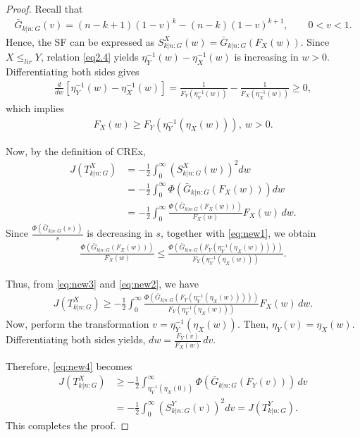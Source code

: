 \documentclass[12pt,a4paper]{article}
\numberwithin{equation}{section}
\begin{document}
\begin{proof}
Recall that
\begin{align*}
    \bar G_{k|n:G}(v)
    =
    (n-k+1)(1-v)^k-(n-k)(1-v)^{k+1},
    \qquad 0<v<1.
\end{align*}
Hence, the SF  can be expressed as
$S^X_{k|n:G}(w)
    =
    \bar G_{k|n:G}(F_X(w)).$ Since $X\leq_{lir}Y$, relation \eqref{eq2.4} yields $\eta_Y^{-1}(w)-\eta_X^{-1}(w)$
is increasing in $w>0$. Differentiating both sides gives
\begin{align*}
    \frac{d}{dw}
    \left[
    \eta_Y^{-1}(w)-\eta_X^{-1}(w)
    \right]
    =
    \frac{1}{F_Y(\eta_Y^{-1}(w))}
    -
    \frac{1}{F_X(\eta_X^{-1}(w))}
    \geq 0,
\end{align*}
which implies
\begin{align}\label{eq:new1}
    F_X(w)
    \geq
    F_Y\!\left(
    \eta_Y^{-1}(\eta_X(w))
    \right),~ w>0.
\end{align}

Now, by the definition of CREx,
\begin{align}
    J(T^X_{k|n:G})
    &=
    -\frac12
    \int_0^\infty
    \left(
    S^X_{k|n:G}(w)
    \right)^2
    dw
    \nonumber\\
    &=-\frac12
    \int_0^\infty
    \Phi\!\left(
    \bar G_{k|n:G}(F_X(w))
    \right)
    dw
    \nonumber\\
    &=-\frac12
    \int_0^\infty
    \frac{
    \Phi\!\left(
    \bar G_{k|n:G}(F_X(w))
    \right)
    }{F_X(w)}
    F_X(w)\,dw.
    \label{eq:new2}
\end{align}
Since $\frac{\Phi(\bar G_{k|n:G}(s))}{s}$
is decreasing in $s$, together with \eqref{eq:new1}, we obtain
\begin{align}
    \frac{
    \Phi(\bar G_{k|n:G}(F_X(w)))
    }{F_X(w)}
    \leq
    \frac{
    \Phi\!\left(
    \bar G_{k|n:G}
    \left(
    F_Y(\eta_Y^{-1}(\eta_X(w)))
    \right)
    \right)
    }{
    F_Y(\eta_Y^{-1}(\eta_X(w)))
    }.
    \label{eq:new3}
\end{align}

Thus, from \eqref{eq:new3} and \eqref{eq:new2}, we have
\begin{align}
    J(T^X_{k|n:G})
    \geq -\frac12
    \int_0^\infty
    \frac{
    \Phi\!\left(
    \bar G_{k|n:G}
    \left(
    F_Y(\eta_Y^{-1}(\eta_X(w)))
    \right)
    \right)
    }{
    F_Y(\eta_Y^{-1}(\eta_X(w)))
    }
    F_X(w)\,dw.
    \label{eq:new4}
\end{align}
Now, perform the transformation $v=\eta_Y^{-1}(\eta_X(w)).$
Then, 
$\eta_Y(v)=\eta_X(w).$
Differentiating both sides yields, 
$dw
    =
    \frac{F_Y(v)}{F_X(w)}\,dv.$

Therefore, \eqref{eq:new4} becomes
\begin{align*}
    J(T^X_{k|n:G})
    &\geq -\frac12
    \int_{\eta_Y^{-1}(\eta_X(0))}^{\infty}
    \Phi\!\left(
    \bar G_{k|n:G}(F_Y(v))
    \right)\,dv
    \\
    &=
    -\frac12
    \int_0^\infty
    \left(
    S^Y_{k|n:G}(v)
    \right)^2
    dv=
    J(T^Y_{k|n:G}).
\end{align*}
This completes the proof.
\end{proof}
\end{document}
